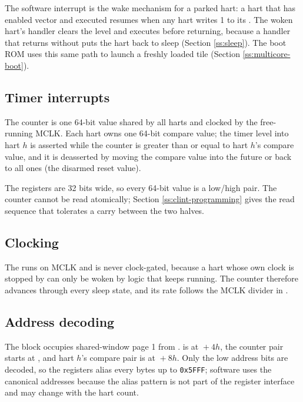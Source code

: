 The software interrupt is the wake mechanism for a parked hart: a hart that has enabled vector \ClintMsipVector{} and executed  resumes when any hart writes 1 to its . The woken hart's handler clears the level and executes  before returning, because a handler that returns without  puts the hart back to sleep (Section \ref{ss:sleep}). The boot ROM uses this same path to launch a freshly loaded tile (Section \ref{ss:multicore-boot}).

\subsection{Timer interrupts}

The counter is one 64-bit value shared by all \NumHartsWord{} harts and clocked by the free-running MCLK. Each hart owns one 64-bit compare value; the timer level into hart $h$ is asserted while the counter is greater than or equal to hart $h$'s compare value, and it is deasserted by moving the compare value into the future or back to all ones (the disarmed reset value).

The registers are 32 bits wide, so every 64-bit value is a low/high pair. The counter cannot be read atomically; Section \ref{ss:clint-programming} gives the read sequence that tolerates a carry between the two halves.

\subsection{Clocking}

The  runs on MCLK and is never clock-gated, because a hart whose own clock is stopped by  can only be woken by logic that keeps running. The counter therefore advances through every sleep state, and its rate follows the MCLK divider in .

\subsection{Address decoding}

The block occupies shared-window page 1 from \texttt{\ClintBaseAddress}.  is at \texttt{\ClintBaseAddress}${}+4h$, the counter pair starts at \texttt{\ClintMtimeAddress}, and hart $h$'s compare pair is at \texttt{\ClintMtimecmpBaseAddress}${}+8h$. Only the low address bits are decoded, so the registers alias every \ClintAliasBytes{} bytes up to \texttt{0x5FFF}; software uses the canonical addresses because the alias pattern is not part of the register interface and may change with the hart count.

